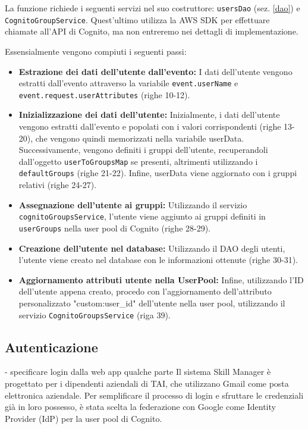 La funzione richiede i seguenti servizi nel suo costruttore: \texttt{usersDao} (sez. \ref{dao}) e \texttt{CognitoGroupService}. Quest'ultimo utilizza la AWS SDK per effettuare chiamate all'API di Cognito, ma non entreremo nei dettagli di implementazione.

Essensialmente vengono compiuti i seguenti passi:

\begin{itemize}
    \item \textbf{Estrazione dei dati dell'utente dall'evento:}
    I dati dell'utente vengono estratti dall'evento attraverso la variabile \texttt{event.userName} e \texttt{event.request.userAttributes} (righe 10-12). 

    \item \textbf{Inizializzazione dei dati dell'utente:}
    Inizialmente, i dati dell'utente vengono estratti dall'evento e popolati con i valori corrispondenti (righe 13-20), che vengono quindi memorizzati nella variabile userData. Successivamente, vengono definiti i gruppi dell'utente, recuperandoli dall'oggetto \texttt{userToGroupsMap} se presenti, altrimenti utilizzando i \texttt{defaultGroups} (righe 21-22). Infine, userData viene aggiornato con i gruppi relativi (righe 24-27).
    
    \item \textbf{Assegnazione dell'utente ai gruppi:}
    Utilizzando il servizio \texttt{cognitoGroupsService}, l'utente viene aggiunto ai gruppi definiti in \texttt{userGroups} nella user pool di Cognito (righe 28-29).

    \item \textbf{Creazione dell'utente nel database:}
    Utilizzando il DAO degli utenti, l'utente viene creato nel database con le informazioni ottenute (righe 30-31).

     \item \textbf{Aggiornamento attributi utente nella UserPool:}
    Infine, utilizzando l'ID dell'utente appena creato, procedo con l'aggiornamento dell'attributo personalizzato "custom:user\_id" dell'utente nella user pool, utilizzando il servizio \texttt{CognitoGroupsService} (riga 39).
    
\end{itemize}

\subsection{Autenticazione}

\label{autenticazione}
 - specificare login dalla web app qualche parte
Il sistema Skill Manager è progettato per i dipendenti aziendali di TAI, che utilizzano Gmail come posta elettronica aziendale. Per semplificare il processo di login e sfruttare le credenziali già in loro possesso, è stata scelta la federazione con Google come Identity Provider (IdP) per la user pool di Cognito.


